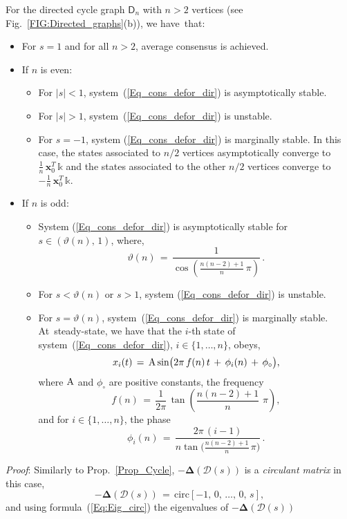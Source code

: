 \documentclass[letterpaper,9pt,twocolumn]{autart}
\newcommand{\vet}[1]{\ensuremath{{\mathbf #1}}}
\begin{document}
\begin{proposition}\label{Prop_DirCyc}
For the directed cycle graph $\textsf{D}_n$ with $n > 2$ vertices 
(see Fig.~\ref{FIG:Directed_graphs}(b)), we have~that:
\begin{itemize}
\item For $s = 1$ and for all $n > 2$, average consensus is achieved.
\item If $n$ is even:
\begin{itemize}
\item For $|s| < 1$, system~(\ref{Eq_cons_defor_dir}) is asymptotically stable.
\item For $|s| > 1$, system~(\ref{Eq_cons_defor_dir}) is unstable.
\item For $s = -1$, system (\ref{Eq_cons_defor_dir}) is marginally stable.
In this case, the states associated to $n/2$ vertices asymptotically
converge to $\frac{1}{n}\,\vet{x}_0^T\,\mathds{k}$
and the states associated to the other $n/2$ vertices converge to $-\frac{1}{n}\,\vet{x}_0^T\,\mathds{k}$.
\end{itemize}
\item If $n$ is odd:
\begin{itemize}
\item System (\ref{Eq_cons_defor_dir}) is asymptotically stable for $s \in (\vartheta(n),\, 1)$, where,
$$
\vartheta(n) \,=\, \frac{1}{\displaystyle\cos\!\left(\frac{n(n-2) + 1}{n}\,\pi\right)}\,.
$$
\item For $s < \vartheta(n)$ or $s > 1$, system (\ref{Eq_cons_defor_dir}) is unstable.
\item For $s = \vartheta(n)$, system~(\ref{Eq_cons_defor_dir}) is marginally stable. At~steady-state,
we have that the $i$-th state of system~(\ref{Eq_cons_defor_dir}), $i
\in \{1,\ldots,n\}$, obeys, $$
x_i(t) \,=\, \textup{A} \sin\!\big(2\pi\,f(n)\,t \,+\, \phi_i(n) \,+\, \phi_{\circ}\big), 
$$
where $\textup{A}$ and $\phi_{\circ}$ are positive constants, the frequency
$$
f(n) \,=\, \frac{1}{2\pi}\,\tan\!\left(\frac{n(n-2) + 1}{n}\,\,\pi\!\right)\!,
$$
and for $i \in \{1,\ldots,n\}$, the phase
$$
\phi_i(n)\,=\, \frac{2\pi\,(i-1)}{n \tan\!\Big(\frac{n(n-2) + 1}{n}\,\pi\Big)}\,.
$$
\end{itemize}
\end{itemize}
\emph{Proof}:
Similarly to Prop.~\ref{Prop_Cycle}, $-\boldsymbol{\Delta}(\mathcal{D}(s))$
is a \emph{circulant matrix} in this case,
$$
-\boldsymbol{\Delta}(\mathcal{D}(s)) \,=\, \text{circ}[-1,\,0,\,\ldots,\,0,\,s],
$$
and using formula~(\ref{Eq:Eig_circ}) the eigenvalues of $-\boldsymbol{\Delta}(\mathcal{D}(s))$

\end{proposition}
\end{document}
